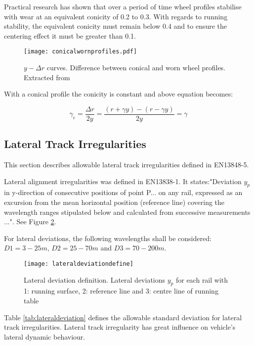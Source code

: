Practical research has shown that over a period of time wheel profiles stabilise with wear at an equivalent conicity of 0.2 to 0.3. With regards to running stability, the equivalent conicity must remain below 0.4 and to ensure the centering effect it must be greater than 0.1.

\begin{figure}[h]
    \centering
    \texttt{[image: conicalwornprofiles.pdf]}
    \caption{$y-\Delta r$ curves. Difference between conical and worn wheel profiles. Extracted from \cite[2.4]{esveld2001modern}}
    \label{fig:conicalwornprofiles}
\end{figure}

With a conical profile the conicity is constant and above equation becomes:

$$ \gamma_e = \frac{\Delta r}{2y} =\frac{(r+\gamma y)-(r-\gamma y)}{2y} = \gamma $$

\subsection{Lateral Track Irregularities}
This section describes allowable lateral track irregularities defined in EN13848-5\cite{13848}. 

Lateral alignment irregularities was defined in EN13838-1. It states:"Deviation $y_p$ in y-direction of consecutive positions of point P... on any rail, expressed as an excursion from the mean horizontal position (reference line) covering the wavelength ranges stipulated below and calculated from successive measurements ...". See Figure \ref{fig:lateraldeviationdefine}.

For lateral deviations, the following wavelengths shall be considered: $D1 = 3 -25 m$, $D2 = 25 - 70 m$ and $D3 = 70 - 200 m$. 

\begin{figure}[h]
    \centering
    \texttt{[image: lateraldeviationdefine]}
    \caption{Lateral deviation definition. Lateral deviations $y_p$ for each rail with 1: running surface, 2: reference line and 3: centre line of running table}
    \label{fig:lateraldeviationdefine}
\end{figure}

Table \ref{tab:lateraldeviation} defines the allowable standard deviation for lateral track irregularities. Lateral track irregularity has great influence on vehicle's lateral dynamic behaviour.

